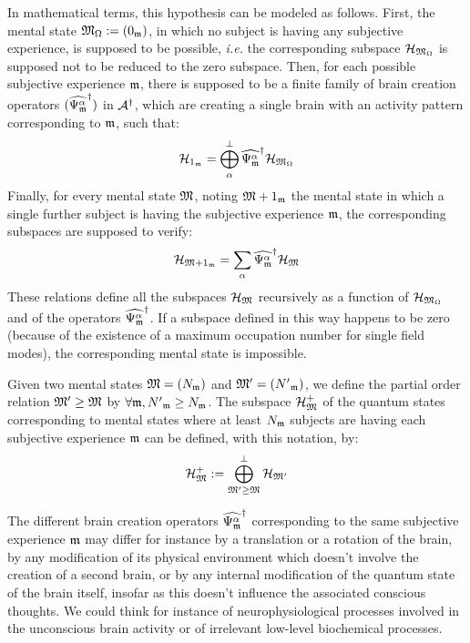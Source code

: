 In mathematical terms, this hypothesis can be modeled as follows. First, the mental state $\mathfrak{M}_\Omega := ({0}_{\mathfrak{m}})$, in which no subject is having any subjective experience, is supposed to be possible, \textit{i.e.} the corresponding subspace $\mathcal H_{\mathfrak{M}_\Omega}$ is supposed not to be reduced to the zero subspace. Then, for each possible subjective experience $\mathfrak{m}$, there is supposed to be a finite family of brain creation operators $(\widehat{\Psi_{\mathfrak{m}}^\alpha}^{\dagger})$ in $\mathcal A^{\dagger}$, which are creating a single brain with an activity pattern corresponding to $\mathfrak{m}$, such that:
\begin{equation*}
\mathcal H_{{1}_{\mathfrak{m}}} = \bigoplus_{\alpha}^\perp \widehat{\Psi_{\mathfrak{m}}^\alpha}^{\dagger} \mathcal H_{\mathfrak{M}_\Omega}
\end{equation*}
Finally, for every mental state $\mathfrak{M}$, noting $\mathfrak{M} + {1}_{\mathfrak{m}}$ the mental state in which a single further subject is having the subjective experience $\mathfrak{m}$, the corresponding subspaces are supposed to verify:
\begin{equation*}
\mathcal H_{\mathfrak{M} + {1}_{\mathfrak{m}}} = \sum_{\alpha} \widehat{\Psi_{\mathfrak{m}}^\alpha}^{\dagger} \mathcal H_{\mathfrak{M}}
\end{equation*}
These relations define all the subspaces $\mathcal H_{\mathfrak{M}}$ recursively as a function of $\mathcal H_{\mathfrak{M}_\Omega}$ and of the operators $\widehat{\Psi_{\mathfrak{m}}^\alpha}^{\dagger}$. If a subspace defined in this way happens to be zero (because of the existence of a maximum occupation number for single field modes), the corresponding mental state is impossible.

Given two mental states $\mathfrak{M} = ({N}_{\mathfrak{m}})$ and $\mathfrak{M}' = ({N'}_{\mathfrak{m}})$, we define the partial order relation $\mathfrak{M}' \geq \mathfrak{M}$ by $\forall \mathfrak{m}, {N'}_{\mathfrak{m}} \geq {N}_{\mathfrak{m}}$. The subspace $\mathcal H_{\mathfrak{M}}^+$ of the quantum states corresponding to mental states where at least ${N}_{\mathfrak{m}}$ subjects are having each subjective experience $\mathfrak{m}$ can be defined, with this notation, by:
\begin{equation*}
\mathcal H_{\mathfrak{M}}^+ := \bigoplus_{\mathfrak{M}' \geq \mathfrak{M}}^\perp \mathcal H_{\mathfrak{M}'}
\end{equation*}

 The different brain creation operators $\widehat{\Psi_{\mathfrak{m}}^\alpha}^{\dagger}$ corresponding to the same subjective experience $\mathfrak{m}$ may differ for instance by a translation or a rotation of the brain, by any modification of its physical environment which doesn't involve the creation of a second brain, or by any internal modification of the quantum state of the brain itself, insofar as this doesn't influence the associated conscious thoughts. We could think for instance of neurophysiological processes involved in the unconscious brain activity or of irrelevant low-level biochemical processes.
